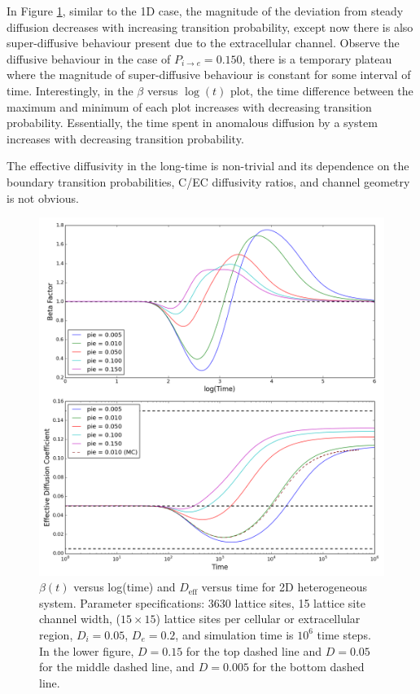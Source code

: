 	In Figure \ref{fig:pie_beta_deff_2D}, similar to the 1D case, the magnitude of the deviation from steady diffusion decreases with increasing transition probability, except now there is also super-diffusive behaviour present due to the extracellular channel. Observe the diffusive behaviour in the case of $ P_{i \rightarrow e}  = 0.150 $, there is a temporary plateau where the magnitude of super-diffusive behaviour is constant for some interval of time. Interestingly, in the $ \beta $ versus $ \log(t) $ plot, the time difference between the maximum and minimum of each plot increases with decreasing transition probability. Essentially, the time spent in anomalous diffusion by a system increases with decreasing transition probability.
	
	The effective diffusivity in the long-time is non-trivial and its dependence on the boundary transition probabilities, C/EC diffusivity ratios, and channel geometry is not obvious.
	
	\begin{figure}[h!]
		\centering
		\includegraphics[width=1.0\linewidth]{../images/2D/pie_beta_deff_2D}
		\caption{$ \beta (t) $ versus log(time) and $ D_\textrm{eff} $ versus time for 2D heterogeneous system. Parameter specifications: 3630 lattice sites, 15 lattice site channel width, ($ 15 \times 15 $) lattice sites per cellular or extracellular region, $ D_i = 0.05 $, $ D_e = 0.2 $, and simulation time is $ 10^6 $ time steps. In the lower figure, $ D = 0.15 $ for the top dashed line and $ D = 0.05 $ for the middle dashed line, and $ D = 0.005 $ for the bottom dashed line.}
		\label{fig:pie_beta_deff_2D}
	\end{figure}

